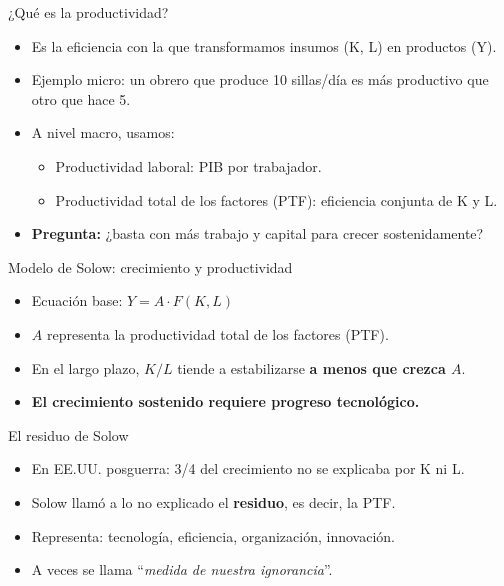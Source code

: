 \documentclass{beamer}
\begin{document}
\begin{frame}{¿Qué es la productividad?}
    \begin{itemize}
        \item Es la eficiencia con la que transformamos insumos (K, L) en productos (Y).
        \item Ejemplo micro: un obrero que produce 10 sillas/día es más productivo que otro que hace 5.
        \item A nivel macro, usamos:
        \begin{itemize}
            \item Productividad laboral: PIB por trabajador.
            \item Productividad total de los factores (PTF): eficiencia conjunta de K y L.
        \end{itemize}
        \item \textbf{Pregunta:} ¿basta con más trabajo y capital para crecer sostenidamente?
    \end{itemize}
\end{frame}

\begin{frame}{Modelo de Solow: crecimiento y productividad}
    \begin{itemize}
        \item Ecuación base: $Y = A \cdot F(K, L)$
        \item $A$ representa la productividad total de los factores (PTF).
        \item En el largo plazo, $K/L$ tiende a estabilizarse \textbf{a menos que crezca $A$}.
        \item \textbf{El crecimiento sostenido requiere progreso tecnológico.}
    \end{itemize}
\end{frame}

\begin{frame}{El residuo de Solow}
    \begin{itemize}
        \item En EE.UU. posguerra: 3/4 del crecimiento no se explicaba por K ni L.
        \item Solow llamó a lo no explicado el \textbf{residuo}, es decir, la PTF.
        \item Representa: tecnología, eficiencia, organización, innovación.
        \item A veces se llama “\textit{medida de nuestra ignorancia}”.
    \end{itemize}
\end{frame}
\end{document}

